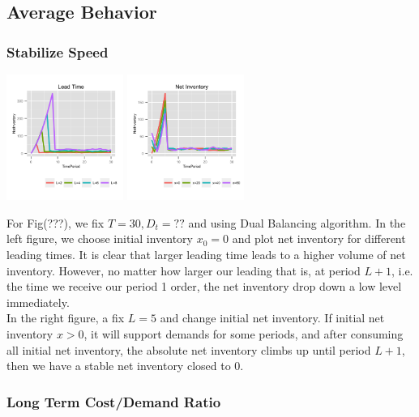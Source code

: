 \documentclass[twoside]{article}
\begin{document}
\begin{multicols}{2}
\subsection{Average Behavior}

\subsubsection{Stabilize Speed}

  \includegraphics[width=1.5in]{figures/LeadTime.png}
  \includegraphics[width=1.5in]{figures/NetInventory.png}

For Fig(???), we fix $T=30, D_t=??$ and using Dual Balancing algorithm. In the left figure, we choose initial inventory $x_0 = 0$ and plot net inventory for different leading times. It is clear that larger leading time leads to a higher volume of net inventory. However, no matter how larger our leading that is, at period $L+1$, i.e. the time we receive our period 1 order, the net inventory drop down a low level immediately.\\
In the right figure, a fix $L = 5$ and change initial net inventory. If initial net inventory $x > 0$, it will support demands for some periods, and after consuming all initial net inventory, the absolute net inventory climbs up until period $L+1$, then we have a stable net inventory closed to 0.\\

\subsubsection{Long Term Cost/Demand Ratio}


\end{multicols}
\end{document}
